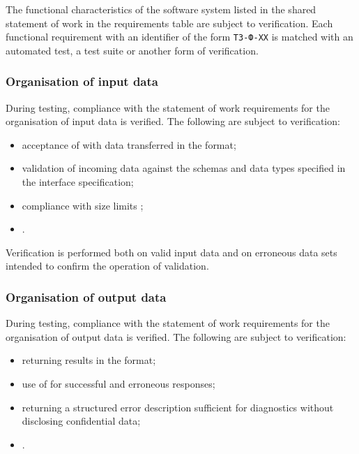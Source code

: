 \documentclass[12pt,a4paper]{extarticle}
\begin{document}
The functional characteristics of the software system listed in the shared statement of work in the requirements table are subject to verification. Each functional requirement with an identifier of the form \texttt{ТЗ-Ф-XX} is matched with an automated test, a test suite or another form of verification.



\clearpage

\subsubsection{Organisation of input data}

\begin{hseExample}
During testing, compliance with the statement of work requirements for the organisation of input data is verified. The following are subject to verification:

\begin{itemize}[leftmargin=1.25cm]
    \item acceptance of  with data transferred in the  format;
    \item validation of incoming data against the schemas and data types specified in the interface specification;
    \item compliance with size limits ;
    \item {}.
\end{itemize}

Verification is performed both on valid input data and on erroneous data sets intended to confirm the operation of validation.
\end{hseExample}

\subsubsection{Organisation of output data}

\begin{hseExample}
During testing, compliance with the statement of work requirements for the organisation of output data is verified. The following are subject to verification:

\begin{itemize}[leftmargin=1.25cm]
    \item returning results in the  format;
    \item use of  for successful and erroneous responses;
    \item returning a structured error description sufficient for diagnostics without disclosing confidential data;
    \item {}.
\end{itemize}
\end{hseExample}
\end{document}
